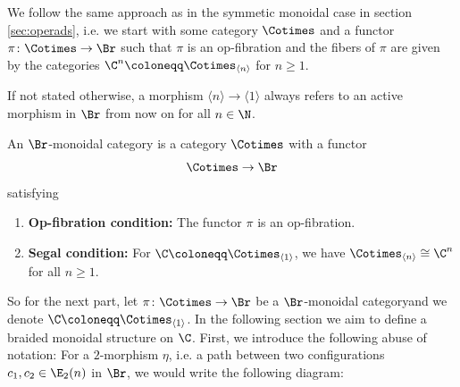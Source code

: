 We follow the same approach as in the symmetic monoidal case in section 
\ref{sec:operads}, i.e. we start with some category $\Cotimes$ and a functor
$\pi \colon \Cotimes \to \Br$ such that $\pi$ is an op-fibration and the fibers 
of $\pi$ are given by the categories $\C^n \coloneqq \Cotimes_{\langle n \rangle}$ 
for $n \geq 1$.

If not stated otherwise, a morphism $\langle n \rangle \to \langle 1 \rangle$ 
always refers to an active morphism in $\Br$ from now on for all $n \in \N$.

\begin{defin}
    An $\Br$-monoidal category  is a category $\Cotimes$ with a functor
    \[
        \Cotimes \to \Br
    \]
    satisfying
        \begin{enumerate}[(M1)]
            \item \textbf{Op-fibration condition:} The functor $\pi$ is an op-fibration.
            \item \textbf{Segal condition:} For $\C \coloneqq \Cotimes_{\langle 1 \rangle}$, 
            we have $\Cotimes_{\langle n \rangle} \cong \C^n$ for all $n \geq 1$. 
        \end{enumerate}

\end{defin}



So for the next part, let $\pi \colon \Cotimes \to \Br$ be a $\Br$-monoidal categoryand we denote
$\C \coloneqq \Cotimes_{\langle 1 \rangle}$.
In the following section we aim to define a braided monoidal structure on $\C$.
First, we introduce the following abuse of notation:
For a $2$-morphism $\eta$, i.e. a path between two configurations $c_1, c_2 \in \E_2(n)$ in $\Br$,
we would write the following diagram:
\begin{center}
\end{center}

